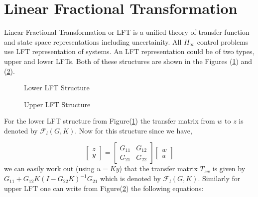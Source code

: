 \documentclass[a4paper,12pt]{article}
\begin{document}
		\section{Linear Fractional Transformation} 
		\label{lft_section}
		Linear Fractional Transformation or LFT is a unified theory of transfer function and state space representations including uncertainity. All $H_{\infty}$ control problems use LFT representation of systems. An LFT representation could be of two types, upper and lower LFTs. Both of these structures are shown in the Figures (\ref{llft}) and (\ref{ulft}).
			\begin{figure}[H]
 
			  \centering
			  
			  
			  \caption{Lower LFT Structure}
			 \label{llft}
		\end{figure}
			\begin{figure}[H]
 
			  \centering
			  
			  
			  \caption{Upper LFT Structure}
			 \label{ulft}
		\end{figure}
		
			For the lower LFT structure from Figure(\ref{llft}) the transfer matrix from $w$ to $z$ is denoted by $\mathscr{F}_{l}(G,K)$. Now for this structure since we have,
		
				\[
				\begin{bmatrix} 
				z\\
				y
				\end{bmatrix} = \begin{bmatrix} G_{11} & G_{12} \\ G_{21} & G_{22}\end{bmatrix} \begin{bmatrix} w \\ u\end{bmatrix}
				\]
			we can easily work out (using $u=Ky$) that the transfer matrix $T_{zw}$ is given by $G_{11}+G_{12}K(I-G_{22}K)^{-1}G_{21}$ which is denoted by $\mathscr{F}_{l}(G,K)$. Similarly for upper LFT one can write from Figure(\ref{ulft}) the following equations: 
			
\end{document}
